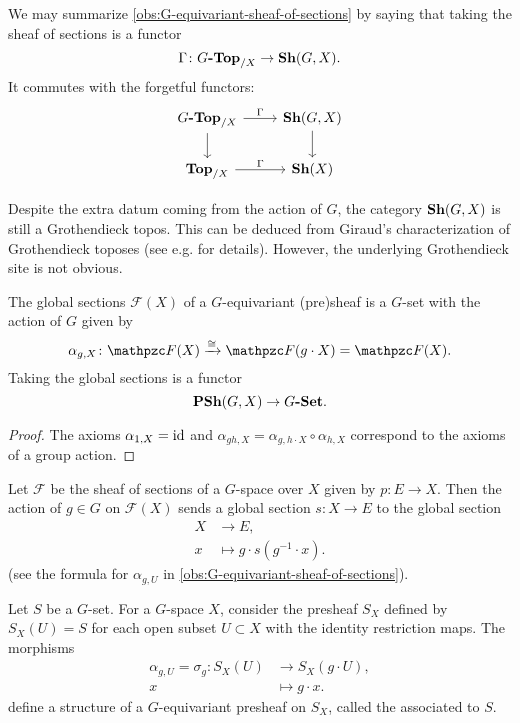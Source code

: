 We may summarize \ref{obs:G-equivariant-sheaf-of-sections} by saying that taking
the sheaf of sections is a functor
$$\Gamma\colon G\text{\bf -Top}_{/X} \to \text{\bf Sh} (G,X).$$
It commutes with the forgetful functors:
\[ \begin{tikzcd}
    G\categ{-Top}_{/X} \ar{r}{\Gamma}\ar{d} & \categ{Sh} (G,X)\ar{d} \\
    \categ{Top}_{/X} \ar{r}{\Gamma} & \categ{Sh} (X)
  \end{tikzcd} \]

\begin{remark}
  Despite the extra datum coming from the action of $G$, the category
  $\text{\bf Sh} (G,X)$ is still a Grothendieck topos. This can be deduced from
  Giraud's characterization of Grothendieck toposes \cite[Exposé~IV, 1.2]{SGA4}
  (see e.g. \cite[Appendix]{MacLane-Moerdijk-94} for details). However, the
  underlying Grothendieck site is not obvious.
\end{remark}

\begin{observation}
  The global sections $\mathcal{F} (X)$ of a $G$-equivariant (pre)sheaf is a
  $G$-set with the action of $G$ given by
  \[ \alpha_{g,X}\colon \mathcal{F} (X) \xrightarrow{\isom}
    \mathcal{F} (g\cdot X) = \mathcal{F} (X). \]
  Taking the global sections is a functor
  $$\text{\bf PSh} (G,X) \to G\text{\bf -Set}.$$

  \begin{proof}
    The axioms $\alpha_{1,X} = \mathrm{id}$ and
    $\alpha_{gh,X} = \alpha_{g,h\cdot X}\circ \alpha_{h,X}$ correspond to the
    axioms of a group action.
  \end{proof}
\end{observation}

\begin{example}
  Let $\mathcal{F}$ be the sheaf of sections of a $G$-space over $X$ given by
  $p\colon E\to X$. Then the action of $g\in G$ on $\mathcal{F} (X)$ sends a
  global section $s\colon X\to E$ to the global section
  \begin{align*}
    X & \to E, \\
    x & \mapsto g\cdot s (g^{-1}\cdot x).
  \end{align*}
  (see the formula for $\alpha_{g,U}$ in
  \ref{obs:G-equivariant-sheaf-of-sections}).
\end{example}

\begin{definition}
  \label{def:constant-G-equivariant-presheaf}
  Let $S$ be a $G$-set. For a $G$-space $X$, consider the presheaf $S_X$ defined
  by $S_X (U) = S$ for each open subset $U \subset X$ with the identity
  restriction maps. The morphisms
  \begin{align*}
    \alpha_{g,U} = \sigma_g\colon S_X (U) & \to S_X (g\cdot U),\\
    x & \mapsto g\cdot x.
  \end{align*}
  define a structure of a $G$-equivariant presheaf on $S_X$, called the
   associated to $S$.
\end{definition}

